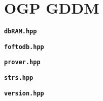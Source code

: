 \documentclass{report}
\begin{document}
\section{OGP GDDM}
\label{sec:ogpgddm}

\textbf{\texttt{dbRAM.hpp}}


\medskip
\textbf{\texttt{foftodb.hpp}}


\medskip
\textbf{\texttt{prover.hpp}}


\medskip
\textbf{\texttt{strs.hpp}}


\medskip
\textbf{\texttt{version.hpp}}

\end{document}
